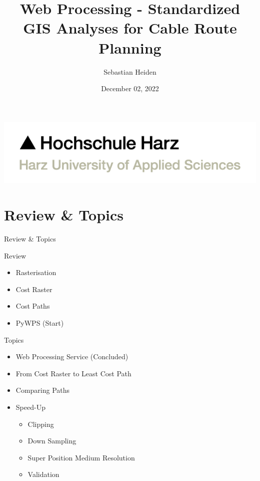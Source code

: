 \documentclass[usenames,dvipsnames,aspectratio=169]{beamer}
\title{Web Processing - Standardized GIS Analyses for Cable Route Planning}
\author{Sebastian Heiden}
\institute{Harz University of Applied Sciences}
\date{December 02, 2022}
\begin{document}
	
	
	
	\begin{frame}[plain]
		\includegraphics[scale=0.21]{images/3-HSH-Logo-RGB-en.png}
		\maketitle
	\end{frame}
	
	
	\section{Review \& Topics}
	\begin{frame}{Review \& Topics}
		
		\begin{minipage}[t]{0.48\textwidth}
			Review
			\begin{itemize}
				\item Rasterisation
				\item Cost Raster
				\item Cost Paths
				\item PyWPS (Start)
			\end{itemize}
		\end{minipage}
		\hfill	
		\begin{minipage}[t]{0.48\textwidth}
			Topics
			\begin{itemize}
				\item Web Processing Service (Concluded)
				\item From Cost Raster to Least Cost Path
				\item Comparing Paths
				\item Speed-Up
				\begin{itemize}
					\item Clipping
					\item Down Sampling
					\item Super Position Medium Resolution
					\item Validation
				\end{itemize}
				
			\end{itemize}
		\end{minipage}
		
	\end{frame}
	
\end{document}
